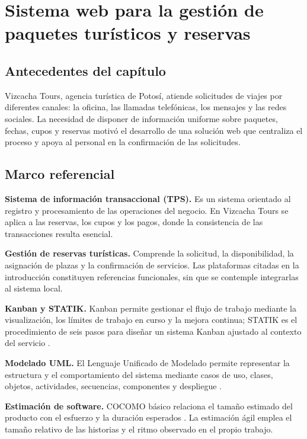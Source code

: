 \chapter{Sistema web para la gestión de paquetes turísticos y reservas}
\label{cap:propuesta}

\section*{Antecedentes del capítulo}

Vizcacha Tours, agencia turística de Potosí, atiende solicitudes de viajes
por diferentes canales: la oficina, las llamadas telefónicas, los mensajes y
las redes sociales. La necesidad de disponer de información uniforme sobre
paquetes, fechas, cupos y reservas motivó el desarrollo de una solución web
que centraliza el proceso y apoya al personal en la confirmación de las
solicitudes.

\section{Marco referencial}

\textbf{Sistema de información transaccional (TPS).} Es un sistema orientado
al registro y procesamiento de las operaciones del negocio. En Vizcacha Tours
se aplica a las reservas, los cupos y los pagos, donde la consistencia de las
transacciones resulta esencial.

\textbf{Gestión de reservas turísticas.} Comprende la solicitud, la
disponibilidad, la asignación de plazas y la confirmación de servicios. Las
plataformas citadas en la introducción \parencite{amadeusGDS,ezus}
constituyen referencias funcionales, sin que se contemple integrarlas al
sistema local.

\textbf{Kanban y STATIK.} Kanban permite gestionar el flujo de trabajo
mediante la visualización, los límites de trabajo en curso y la mejora
continua; STATIK es el procedimiento de seis pasos para diseñar un sistema
Kanban ajustado al contexto del servicio \parencite{kanbanGuia}.

\textbf{Modelado UML.} El Lenguaje Unificado de Modelado permite representar
la estructura y el comportamiento del sistema mediante casos de uso, clases,
objetos, actividades, secuencias, componentes y despliegue
\parencite{omgUml}.

\textbf{Estimación de software.} COCOMO básico relaciona el tamaño estimado
del producto con el esfuerzo y la duración esperados \parencite{boehm1981}.
La estimación ágil emplea el tamaño relativo de las historias y el ritmo
observado en el propio trabajo.

